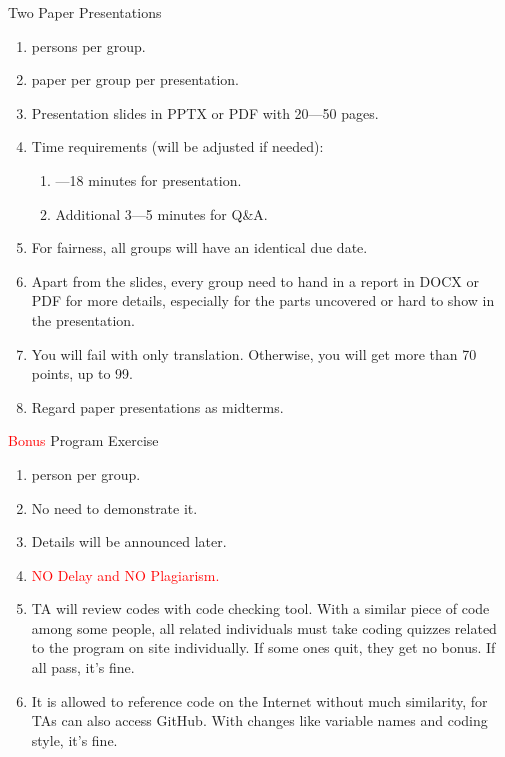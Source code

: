 \documentclass[aspectratio=169, 14pt, UTF8, t]{beamer}
\let\olditem\item
\renewcommand\item{\olditem\justifying}
\begin{document}
\begin{frame}{Two Paper Presentations}
  \begin{enumerate}
    \item 2 persons per group.
    \item 1 paper per group per presentation.
    \item Presentation slides in PPTX or PDF with 20---50 pages.
    \item Time requirements (will be adjusted if needed):
          \begin{enumerate}
            \item 15---18 minutes for presentation.
            \item Additional 3---5 minutes for Q\&A.
          \end{enumerate}
    \item For fairness, all groups will have an identical due date.
    \item Apart from the slides, every group need to hand in a report in DOCX or PDF for more details, especially for the parts uncovered or hard to show in the presentation.
    \item You will fail with only translation. Otherwise, you will get more than 70 points, up to 99.
    \item Regard paper presentations as midterms.
  \end{enumerate}
\end{frame}

\begin{frame}{\textcolor{red}{Bonus} Program Exercise}
  \begin{enumerate}
    \item 1 person per group.
    \item No need to demonstrate it.
    \item Details will be announced later.
    \item \textcolor{red}{NO Delay and NO Plagiarism.}
    \item TA will review codes with code checking tool. With a similar piece of code among some people, all related individuals must take coding quizzes related to the program on site individually. If some ones quit, they get no bonus. If all pass, it's fine.
    \item It is allowed to reference code on the Internet without much similarity, for TAs can also access GitHub. With changes like variable names and coding style, it's fine.
  \end{enumerate}
\end{frame}
\end{document}
